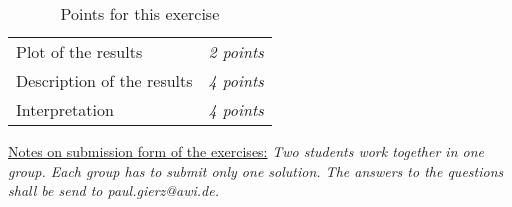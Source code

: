 \documentclass[a4paper,12pt]{article}
\begin{document}
\begin{table}[h]
\centering
\begin{tabular}{lr}
	Plot of the results & \textit{ 2 points}\\
	Description of the results& \textit{ 4 points}\\
	Interpretation &\textit{ 4 points}

\end{tabular}
\caption{Points for this exercise}
\label{tab:}
\end{table}

\vfill
\underline{Notes on submission form of the exercises:}
 \textit{Two students work together in one group. Each group has to submit only one solution. The answers to the questions shall be send to paul.gierz@awi.de.}
\end{document}
